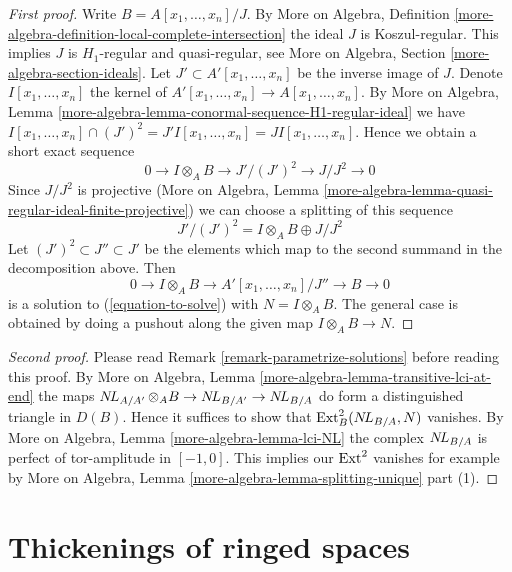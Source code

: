 \begin{proof}[First proof]
Write $B = A[x_1, \ldots, x_n]/J$. By More on Algebra, Definition
\ref{more-algebra-definition-local-complete-intersection}
the ideal $J$ is Koszul-regular. This implies $J$ is $H_1$-regular and
quasi-regular, see More on Algebra, Section \ref{more-algebra-section-ideals}.
Let $J' \subset A'[x_1, \ldots, x_n]$
be the inverse image of $J$. Denote $I[x_1, \ldots, x_n]$ the
kernel of $A'[x_1, \ldots, x_n] \to A[x_1, \ldots, x_n]$.
By More on Algebra, Lemma
\ref{more-algebra-lemma-conormal-sequence-H1-regular-ideal} we have
$I[x_1, \ldots, x_n] \cap (J')^2 = J'I[x_1, \ldots, x_n] =
JI[x_1, \ldots, x_n]$. Hence we obtain a short exact sequence
$$
0 \to I \otimes_A B \to J'/(J')^2 \to J/J^2 \to 0
$$
Since $J/J^2$ is projective (More on Algebra, Lemma
\ref{more-algebra-lemma-quasi-regular-ideal-finite-projective})
we can choose a splitting of this sequence
$$
J'/(J')^2 = I \otimes_A B \oplus J/J^2 
$$
Let $(J')^2 \subset J'' \subset J'$ be the elements which map to the
second summand in the decomposition above. Then
$$
0 \to I \otimes_A B \to A'[x_1, \ldots, x_n]/J'' \to B \to 0
$$
is a solution to (\ref{equation-to-solve}) with $N = I \otimes_A B$.
The general case is obtained by doing a pushout along the given
map $I \otimes_A B \to N$.
\end{proof}

\begin{proof}[Second proof]
Please read Remark \ref{remark-parametrize-solutions}
before reading this proof. By
More on Algebra, Lemma \ref{more-algebra-lemma-transitive-lci-at-end}
the maps $\mathop{N\!L}\nolimits_{A/A'} \otimes_A B \to \mathop{N\!L}\nolimits_{B/A'} \to \mathop{N\!L}\nolimits_{B/A}$
do form a distinguished triangle in $D(B)$.
Hence it suffices to show that $\mathop{\mathrm{Ext}}\nolimits^2_B(\mathop{N\!L}\nolimits_{B/A}, N)$ vanishes.
By More on Algebra, Lemma \ref{more-algebra-lemma-lci-NL}
the complex $\mathop{N\!L}\nolimits_{B/A}$ is perfect of tor-amplitude in
$[-1, 0]$. This implies our $\mathop{\mathrm{Ext}}\nolimits^2$ vanishes for example
by More on Algebra, Lemma \ref{more-algebra-lemma-splitting-unique} part (1).
\end{proof}







\section{Thickenings of ringed spaces}
\label{section-thickenings-spaces}

